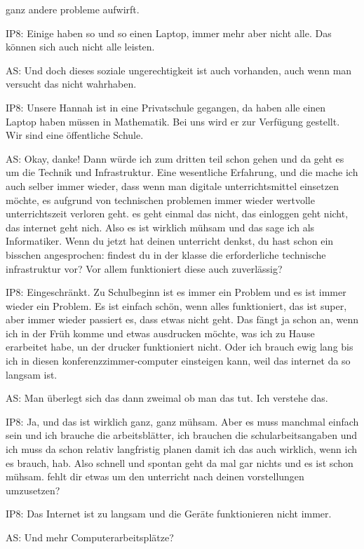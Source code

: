 \documentclass[fontsize=11pt,paper=a4]{scrbook}
\begin{document}
{\begin{itemize*}
		ganz andere probleme aufwirft.
		\item[IP8:] Einige haben so und so einen Laptop, immer mehr aber nicht alle. Das können sich auch nicht alle leisten.
		\item[AS:] Und doch dieses soziale
		ungerechtigkeit ist auch vorhanden, auch wenn man versucht das nicht wahrhaben.
		\item[IP8:] Unsere Hannah ist in eine Privatschule gegangen, da haben alle einen Laptop haben müssen in Mathematik. Bei uns wird er zur Verfügung gestellt. Wir sind eine öffentliche Schule. 
		\item[AS:] Okay, danke! Dann würde ich zum
		dritten teil schon gehen und da geht es
		um die Technik und Infrastruktur. Eine
		wesentliche Erfahrung, und die mache ich
		auch selber immer wieder, dass wenn man
		digitale unterrichtsmittel einsetzen möchte, es aufgrund von
		technischen problemen immer wieder
		wertvolle unterrichtszeit verloren geht.
		es geht einmal das nicht, das
		einloggen geht nicht, das internet geht nich. Also es ist 
		wirklich mühsam und das sage ich als Informatiker.
		Wenn du jetzt hat deinen unterricht
		denkst, du hast schon ein bisschen angesprochen:
		findest du in der klasse die
		erforderliche technische infrastruktur
		vor? Vor allem funktioniert diese auch
		zuverlässig?
		\item[IP8:] Eingeschränkt. Zu Schulbeginn ist es immer ein Problem und es ist immer wieder ein Problem. Es ist einfach schön, wenn alles funktioniert, das ist super, aber immer wieder
		passiert es, dass etwas nicht geht. Das fängt
		ja schon an, wenn ich in der Früh komme und etwas ausdrucken möchte, was ich zu Hause erarbeitet habe, un der drucker funktioniert nicht. Oder ich brauch ewig lang bis ich in diesen konferenzzimmer-computer
		einsteigen kann, weil das internet da so
		langsam ist.
		\item[AS:] Man überlegt sich das dann zweimal ob man das tut. Ich verstehe das.
		\item[IP8:] Ja, und das ist wirklich ganz, ganz mühsam. Aber es muss manchmal einfach sein und ich
		brauche die arbeitsblätter, ich brauchen die
		schularbeitsangaben und ich muss da
		schon relativ langfristig planen damit
		ich das auch wirklich, wenn ich es brauch, hab. Also schnell und spontan geht da mal gar nichts und es ist schon mühsam.
		fehlt dir etwas um den unterricht nach
		deinen vorstellungen umzusetzen?
		\item[IP8:] Das Internet ist
		zu langsam und die Geräte funktionieren nicht immer.
		\item[AS:] Und mehr Computerarbeitsplätze?

\end{itemize*}}
\end{document}
